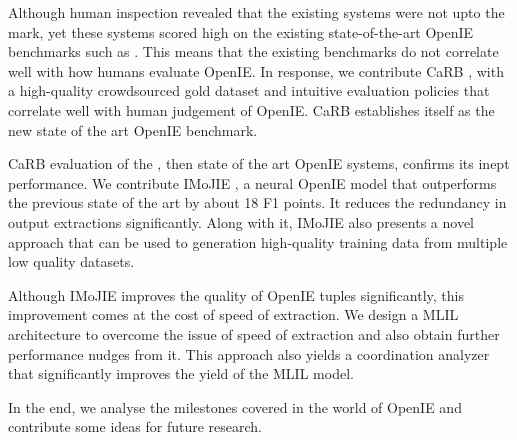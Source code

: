 Although human inspection revealed that the existing systems were not upto the mark, yet these systems scored high on the existing state-of-the-art OpenIE benchmarks such as \cite{OIE2016}. This means that the existing benchmarks do not correlate well with how humans evaluate OpenIE. In response, we contribute CaRB \cite{bhardwaj&al19}, with a high-quality crowdsourced gold dataset and intuitive evaluation policies that correlate well with human judgement of OpenIE. CaRB establishes itself as the new state of the art OpenIE benchmark.

CaRB evaluation of the \citet{cui&al18}, then state of the art OpenIE systems, confirms its inept performance. We contribute IMoJIE \cite{kolluru&al20}, a neural OpenIE model that outperforms the previous state of the art by about 18 F1 points. It reduces the redundancy in output extractions significantly. Along with it, IMoJIE also presents a novel approach that can be used to generation high-quality training data from multiple low quality datasets.

Although IMoJIE improves the quality of OpenIE tuples significantly, this improvement comes at the cost of speed of extraction. We design a MLIL architecture to overcome the issue of speed of extraction and also obtain further performance nudges from it. This approach also yields a coordination analyzer that significantly improves the yield of the MLIL model.

In the end, we analyse the milestones covered in the world of OpenIE and contribute some ideas for future research.